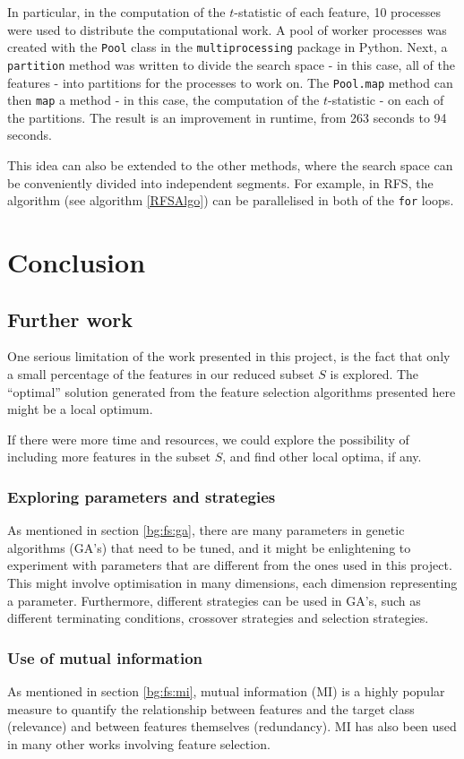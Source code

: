 \documentclass[12pt, twoside, a4paper]{report}
\begin{document}
In particular, in the computation of the $t$-statistic of each feature, 10 processes were used to distribute the computational work. A pool of worker processes was created with the \texttt{Pool} class in the \texttt{multiprocessing} package in Python. Next, a \texttt{partition} method was written to divide the search space - in this case, all of the features - into partitions for the processes to work on. The \texttt{Pool.map} method can then \texttt{map} a method - in this case, the computation of the $t$-statistic - on each of the partitions. The result is an improvement in runtime, from 263 seconds to 94 seconds.

This idea can also be extended to the other methods, where the search space can be conveniently divided into independent segments. For example, in RFS, the algorithm (see algorithm \ref{RFSAlgo}) can be parallelised in both of the \texttt{for} loops. 


\chapter{Conclusion}
\section{Further work}

One serious limitation of the work presented in this project, is the fact that only a small percentage of the features in our reduced subset $S$ is explored. The ``optimal'' solution generated from the feature selection algorithms presented here might be a local optimum.

If there were more time and resources, we could explore the possibility of including more features in the subset $S$, and find other local optima, if any.


\subsection{Exploring parameters and strategies}
As mentioned in section \ref{bg:fs:ga}, there are many parameters in genetic algorithms (GA's) that need to be tuned, and it might be enlightening to experiment with parameters that are different from the ones used in this project. This might involve optimisation in many dimensions, each dimension representing a parameter. Furthermore, different strategies can be used in GA's, such as different terminating conditions, crossover strategies and selection strategies.


\subsection{Use of mutual information}
As mentioned in section \ref{bg:fs:mi}, mutual information (MI) is a highly popular measure to quantify the relationship between features and the target class (relevance) and between features themselves (redundancy). MI has also been used in many other works involving feature selection.
\end{document}
